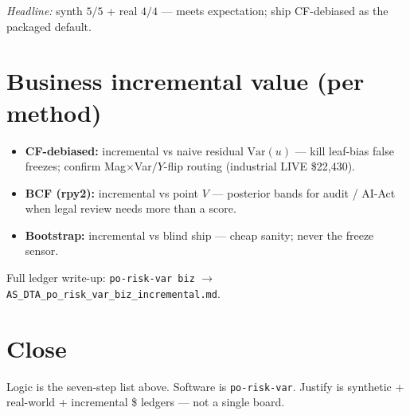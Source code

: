 \documentclass[11pt]{article}
\begin{document}
\noindent\textit{Headline:} synth $5/5$ + real $4/4$ --- meets expectation;
ship CF-debiased as the packaged default.

\section{Business incremental value (per method)}

\begin{itemize}[leftmargin=1.3em,itemsep=0.25em]
  \item \textbf{CF-debiased:} incremental vs naive residual
        $\mathrm{Var}(u)$ --- kill leaf-bias false freezes; confirm
        Mag$\times$Var$/Y$-flip routing (industrial LIVE \$22{,}430).
  \item \textbf{BCF (rpy2):} incremental vs point $V$ --- posterior
        bands for audit / AI-Act when legal review needs more than a score.
  \item \textbf{Bootstrap:} incremental vs blind ship --- cheap sanity;
        never the freeze sensor.
\end{itemize}
\noindent
Full ledger write-up: \texttt{po-risk-var biz} $\to$
\texttt{AS\_DTA\_po\_risk\_var\_biz\_incremental.md}.

\section*{Close}
Logic is the seven-step list above.
Software is \texttt{po-risk-var}.
Justify is synthetic + real-world + incremental \$ ledgers --- not a single board.
\end{document}
